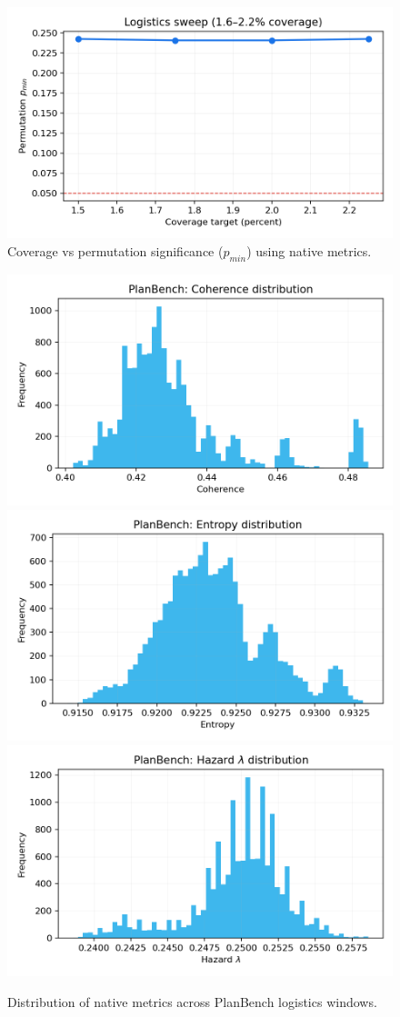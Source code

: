 \documentclass[11pt]{article}
\begin{document}
\begin{figure}[t]
  \centering
  \includegraphics[width=0.75\linewidth]{../figures/fig1_logistics_sweep.png}
  \caption{Coverage vs permutation significance ($p_{min}$) using native metrics.}
  \label{fig:logistics-sweep}
\end{figure}

\begin{figure}[t]
  \centering
  \includegraphics[width=0.32\linewidth]{../figures/planbench_metrics/planbench_coherence_hist.png}
  \includegraphics[width=0.32\linewidth]{../figures/planbench_metrics/planbench_entropy_hist.png}
  \includegraphics[width=0.32\linewidth]{../figures/planbench_metrics/planbench_lambda_hist.png}
  \caption{Distribution of native metrics across PlanBench logistics windows.}
  \label{fig:planbench-metrics}
\end{figure}
\end{document}
